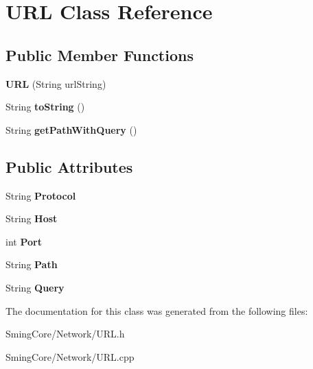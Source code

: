 \hypertarget{class_u_r_l}{}\section{U\+R\+L Class Reference}
\label{class_u_r_l}
\subsection*{Public Member Functions}
\begin{DoxyCompactItemize}
\item 
\hypertarget{class_u_r_l_a2c99de3fe6f5c883b5dd960b29f065b6}{}{\bfseries U\+R\+L} (String url\+String)\label{class_u_r_l_a2c99de3fe6f5c883b5dd960b29f065b6}

\item 
\hypertarget{class_u_r_l_aad0ad594035598ddb2450b6ec6cd4278}{}String {\bfseries to\+String} ()\label{class_u_r_l_aad0ad594035598ddb2450b6ec6cd4278}

\item 
\hypertarget{class_u_r_l_ad411b6e8175960498d8d60575b27ad3e}{}String {\bfseries get\+Path\+With\+Query} ()\label{class_u_r_l_ad411b6e8175960498d8d60575b27ad3e}

\end{DoxyCompactItemize}
\subsection*{Public Attributes}
\begin{DoxyCompactItemize}
\item 
\hypertarget{class_u_r_l_a241896621c02e3a9b43e3176738651c4}{}String {\bfseries Protocol}\label{class_u_r_l_a241896621c02e3a9b43e3176738651c4}

\item 
\hypertarget{class_u_r_l_a4a48d77473885ef578f9ddadc3fef725}{}String {\bfseries Host}\label{class_u_r_l_a4a48d77473885ef578f9ddadc3fef725}

\item 
\hypertarget{class_u_r_l_a178bf8b4e5eb686461419c307b0df802}{}int {\bfseries Port}\label{class_u_r_l_a178bf8b4e5eb686461419c307b0df802}

\item 
\hypertarget{class_u_r_l_a14f066a85d97e35ddcacab0baa557537}{}String {\bfseries Path}\label{class_u_r_l_a14f066a85d97e35ddcacab0baa557537}

\item 
\hypertarget{class_u_r_l_af859a9118c238e96316cf39b6233549d}{}String {\bfseries Query}\label{class_u_r_l_af859a9118c238e96316cf39b6233549d}

\end{DoxyCompactItemize}


The documentation for this class was generated from the following files\+:\begin{DoxyCompactItemize}
\item 
Sming\+Core/\+Network/U\+R\+L.\+h\item 
Sming\+Core/\+Network/U\+R\+L.\+cpp\end{DoxyCompactItemize}

